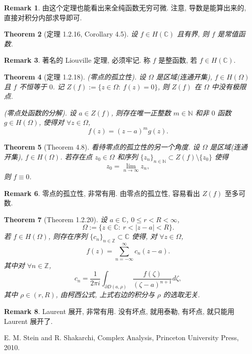 \documentclass[a4paper,11pt]{article}
\newtheorem{theorem}{Theorem}[section]
\theoremstyle{definition}
\newtheorem{remark}[theorem]{Remark}
\begin{document}
\begin{remark}
    由这个定理也能看出来全纯函数无穷可微.
    注意, 导数是能算出来的, 直接对积分内部求导即可.
\end{remark}

\begin{theorem}[定理 1.2.16, Corollary 4.5]
    设 $ f \in H(\mathbb{C}) $ 且有界, 则 $ f $ 是常值函数.
\end{theorem}

\begin{remark}
    著名的 Liouville 定理, 必须牢记. 
    称 $ f $ 是整函数, 若 $ f \in H(\mathbb{C}) $.
\end{remark}

\begin{theorem}[定理 1.2.18]
    (零点的孤立性). 设 $ \Omega $ 是区域(连通开集), $ f \in H(\Omega) $ 且 $ f $ 不恒等于 $ 0 $.
    记 $ Z(f) := \{z \in \Omega :\ f(z) = 0\} $, 则 $ Z(f) $ 在 $ \Omega $ 中没有极限点.
    
    (零点处函数的分解). 设 $ a \in Z(f) $, 则存在唯一正整数 $ m \in \mathbb{N} $ 
    和非 $ 0 $ 函数 $ g \in H(\Omega) $, 使得对 $ \forall z \in \Omega $,
    $$
        f(z) = (z - a)^m g(z).
    $$
\end{theorem}

\begin{theorem}[Theorem 4.8]
    看待零点的孤立性的另一个角度.
    设 $ \Omega $ 是区域(连通开集), $ f \in H(\Omega) $.
    若存在点 $ z_0 \in \Omega $ 和序列 $ \{z_n\}_{n \in \mathbb{N}} \subset Z(f) \setminus \{z_0\} $ 使得
    $$
        z_0 = \lim_{n \to \infty} z_n,
    $$
    则 $ f \equiv 0 $.
\end{theorem}

\begin{remark}
    零点的孤立性, 非常有用. 由零点的孤立性, 容易看出 $ Z(f) $ 至多可数.
\end{remark}

\begin{theorem}[Theorem 1.2.20]
    设 $ a \in \mathbb{C} $, $ 0 \leq r < R < \infty $, 
    $$ \Omega := \{z \in \mathbb{C} :\ r < |z - a| < R \}. $$
    若 $ f \in H(\Omega) $, 则存在序列 $ \{c_n\}_{n \in \mathbb{Z}} \subset \mathbb{C} $ 使得, 
    对 $ \forall z \in \Omega $,
    $$
        f(z) = \sum_{n=-\infty}^\infty c_n (z - a).
    $$
    其中对 $ \forall n \in \mathbb{Z} $,
    $$
        c_n = \frac{1}{2 \pi i} \int_{\partial D(a, \rho)} \frac{f(\zeta)}{(\zeta - a)^{n+1}} d\zeta,
    $$
    其中 $ \rho \in (r, R) $, 由柯西公式, 上式右边的积分与 $ \rho $ 的选取无关.
\end{theorem}

\begin{remark}
    Laurent 展开, 非常有用. 没有坏点, 就用泰勒, 有坏点, 就只能用 Laurent 展开了.
\end{remark}

\begin{thebibliography}{99}

      E. M. Stein and R. Shakarchi, Complex Analysis, Princeton University Press, 2010.
    
\end{thebibliography}
\end{document}

